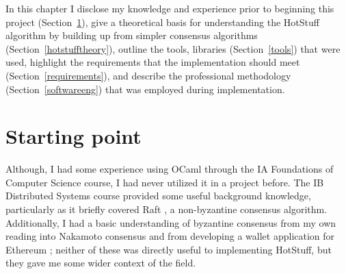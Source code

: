



In this chapter I disclose my knowledge and experience prior to beginning this project (Section~\ref{start}), give a theoretical basis for understanding the HotStuff algorithm by building up from simpler consensus algorithms (Section~\ref{hotstufftheory}), outline the tools, libraries (Section~\ref{tools}) that were used, highlight the requirements that the implementation should meet (Section~\ref{requirements}), and describe the professional methodology (Section~\ref{softwareeng}) that was employed during implementation.

\section{Starting point} \label{start}
Although, I had some experience using OCaml through the IA Foundations of Computer Science course, I had never utilized it in a project before. The IB Distributed Systems course provided some useful background knowledge, particularly as it briefly covered Raft \cite{ongaroSearchUnderstandableConsensus2014}, a non-byzantine consensus algorithm. Additionally, I had a basic understanding of byzantine consensus from my own reading into Nakamoto consensus \cite{nakamotoBitcoinPeertoPeerElectronic2008} and from developing a wallet application for Ethereum \cite{ethereumWhite, ethereumYellow}; neither of these was directly useful to implementing HotStuff, but they gave me some wider context of the field.

